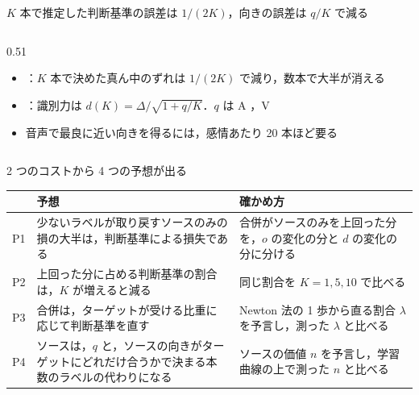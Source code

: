 \begin{frame}{$K$ 本で推定した判断基準の誤差は $1/(2K)$，向きの誤差は $q/K$ で減る}
\begin{columns}[T,onlytextwidth]
    \begin{column}{0.51\textwidth}
      \begin{itemize}\footnotesize\setlength{\itemsep}{10pt}
        \item {}：$K$ 本で決めた真ん中のずれは $1/(2K)$ で減り，数本で大半が消える
        \item {}：識別力は $d(K) = \Delta/\sqrt{1+q/K}$．$q$ は A ，V 
        \item 音声で最良に近い向きを得るには，感情あたり 20 本ほど要る
      \end{itemize}
    \end{column}
  \end{columns}
\end{frame}

\begin{frame}{2 つのコストから 4 つの予想が出る}
  \vspace{0.3em}
  \centering\footnotesize
  \renewcommand{\arraystretch}{1.35}
  \begin{tabularx}{\textwidth}{@{}l X X@{}}
    \toprule
    & 予想 & 確かめ方 \\
    \midrule
    P1 & 少ないラベルが取り戻すソースのみの損の大半は，判断基準による損失である & 合併がソースのみを上回った分を，$o$ の変化の分と $d$ の変化の分に分ける \\
    P2 & 上回った分に占める判断基準の割合は，$K$ が増えると減る & 同じ割合を $K = 1, 5, 10$ で比べる \\
    P3 & 合併は，ターゲットが受ける比重に応じて判断基準を直す & Newton 法の 1 歩から直る割合 $\lambda$ を予言し，測った $\lambda$ と比べる \\
    P4 & ソースは，$q$ と，ソースの向きがターゲットにどれだけ合うかで決まる本数のラベルの代わりになる & ソースの価値 $n$ を予言し，学習曲線の上で測った $n$ と比べる \\
    \bottomrule
  \end{tabularx}
\end{frame}

